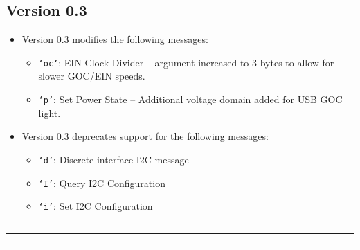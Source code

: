 \subsection{Version 0.3}
\label{protocol-0-3}

\begin{itemize}
\item Version 0.3 modifies the following messages:
\begin{itemize}
  \item {\tt `oc'}: EIN Clock Divider -- argument increased to 3 bytes to allow for slower GOC/EIN speeds.
  \item {\tt `p'}: Set Power State -- Additional voltage domain added for USB GOC light.
\end{itemize}

\item Version 0.3 deprecates support for the following messages:
\begin{itemize}
  \item {\tt `d'}: Discrete interface I2C message
  \item {\tt `I'}: Query I2C Configuration
  \item {\tt `i'}: Set I2C Configuration
\end{itemize}
\end{itemize}

\setcounter{tocdepth}{4}
\etocsettocstyle
    {\subsection*{\contentsname}\hrule\medskip
        }
    {\nobreak\medskip\hrule\bigskip}

\localtableofcontents

